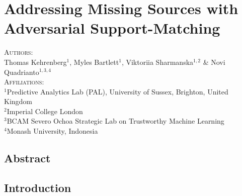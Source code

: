 \chapter{Addressing Missing Sources with Adversarial Support-Matching}\label{ch:supmatch}

% 




\textsc{Authors}:\\
%
Thomas Kehrenberg$^1$, 
Myles Bartlett$^1$,
Viktoriia Sharmanska$^{1, 2}$ \& 
Novi Quadrianto$^{1,3,4}$ \\
%
\textsc{Affiliations}:\\
$^1$Predictive Analytics Lab (PAL), University of Sussex, Brighton, United Kingdom \\
$^2$Imperial College London \\ 
$^3$BCAM Severo Ochoa Strategic Lab on Trustworthy Machine Learning \\
$^4$Monash University, Indonesia \\
%

\section*{Abstract}

\label{sec:abstract}

\section{Introduction}
\label{sec:intro}


